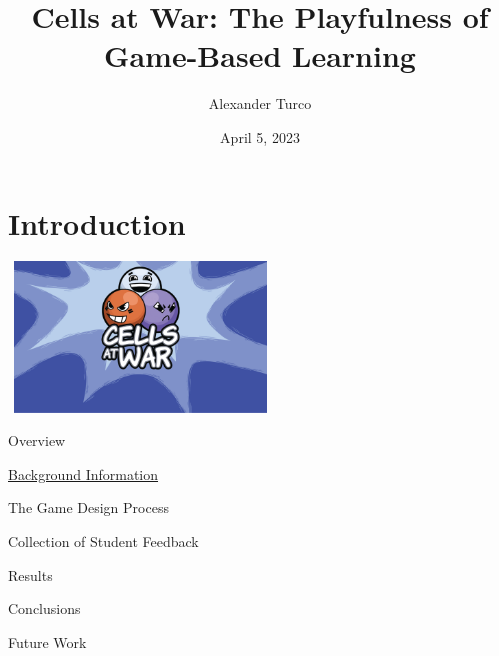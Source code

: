 \documentclass{beamer}
\title[BEAP Dec 2022]{Cells at War: The Playfulness of Game-Based Learning}
\author{Alexander Turco}
\date{April 5, 2023}
\begin{document}
	
	\section{Introduction}
	\begin{frame}
		\titlepage 
		\begin{center}
			\includegraphics[width=7cm, height=4cm]{cellsatwar.png}
		\end{center}
	\end{frame}
	
	\logo{}
	
	\begin{frame}{Overview}
		
		\begin{center}
		\begin{minipage}{6cm}
				
		  		\begin{block}{} \hyperlink{link1}{Background Information} \end{block}
		  		\begin{block}{} The Game Design Process \end{block}
		  		\begin{block}{} Collection of Student Feedback \end{block}
		  		\begin{block}{} Results \end{block}
		  		\begin{block}{} Conclusions \end{block}
		  		\begin{block}{} Future Work \end{block}

		\end{minipage}
		\end{center}
	
	\end{frame}
	
\end{document}

